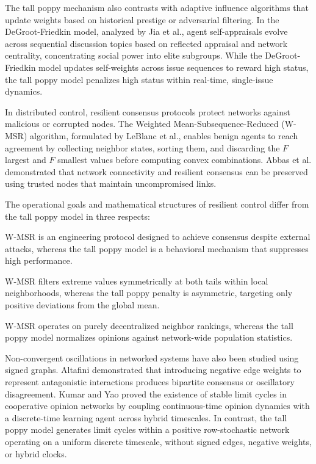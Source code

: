 The tall poppy mechanism also contrasts with adaptive influence algorithms that update weights based on historical prestige or adversarial filtering\cite{degroot1974reaching,hajnal1958weak}. In the DeGroot-Friedkin model, analyzed by Jia et al., agent self-appraisals evolve across sequential discussion topics based on reflected appraisal and network centrality, concentrating social power into elite subgroups\cite{degroot1974reaching,hajnal1958weak}. While the DeGroot-Friedkin model updates self-weights across issue sequences to reward high status, the tall poppy model penalizes high status within real-time, single-issue dynamics\cite{hajnal1958weak}.

In distributed control, resilient consensus protocols protect networks against malicious or corrupted nodes\cite{hajnal1958weak}. The Weighted Mean-Subsequence-Reduced (W-MSR) algorithm, formulated by LeBlanc et al., enables benign agents to reach agreement by collecting neighbor states, sorting them, and discarding the $F$ largest and $F$ smallest values before computing convex combinations\cite{hajnal1958weak,leblanc2013resilient}. Abbas et al. demonstrated that network connectivity and resilient consensus can be preserved using trusted nodes that maintain uncompromised links\cite{hajnal1958weak}.

The operational goals and mathematical structures of resilient control differ from the tall poppy model in three respects\cite{hajnal1958weak}:

W-MSR is an engineering protocol designed to achieve consensus despite external attacks, whereas the tall poppy model is a behavioral mechanism that suppresses high performance\cite{hajnal1958weak}.

W-MSR filters extreme values symmetrically at both tails within local neighborhoods, whereas the tall poppy penalty is asymmetric, targeting only positive deviations from the global mean\cite{hajnal1958weak}.

W-MSR operates on purely decentralized neighbor rankings, whereas the tall poppy model normalizes opinions against network-wide population statistics\cite{hajnal1958weak}.

Non-convergent oscillations in networked systems have also been studied using signed graphs\cite{hajnal1958weak,leblanc2013resilient}. Altafini demonstrated that introducing negative edge weights to represent antagonistic interactions produces bipartite consensus or oscillatory disagreement\cite{hajnal1958weak,leblanc2013resilient}. Kumar and Yao proved the existence of stable limit cycles in cooperative opinion networks by coupling continuous-time opinion dynamics with a discrete-time learning agent across hybrid timescales\cite{hajnal1958weak}. In contrast, the tall poppy model generates limit cycles within a positive row-stochastic network operating on a uniform discrete timescale, without signed edges, negative weights, or hybrid clocks\cite{hajnal1958weak}.

